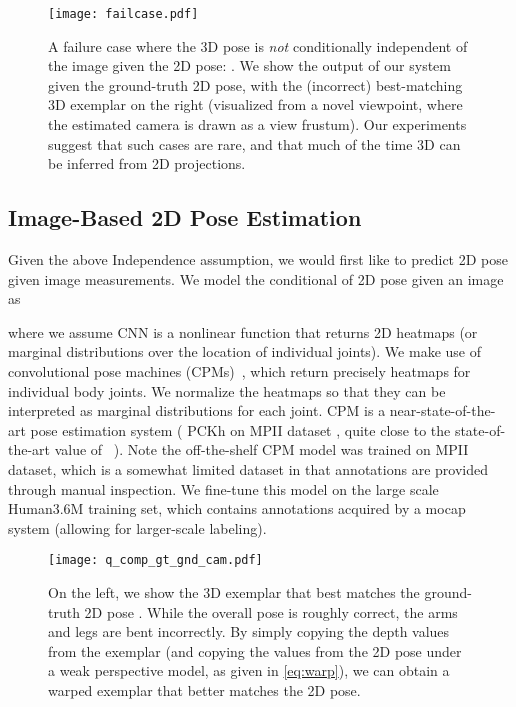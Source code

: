 \documentclass[10pt,twocolumn,letterpaper]{article}
\begin{document}
\begin{figure}[t!]
\centering
\texttt{[image: failcase.pdf]}
\caption{A failure case where the 3D pose is {\em not} conditionally independent of the image given the 2D pose: . We show the output of our system given the ground-truth 2D pose,  with the (incorrect) best-matching 3D exemplar on the right (visualized from a novel viewpoint, where the estimated camera is drawn as a view frustum). Our experiments suggest that such cases are rare, and that much of the time 3D can be inferred from 2D projections.}
\label{fig:failcase}
\end{figure}


\subsection{Image-Based 2D Pose Estimation}
Given the above Independence assumption, we would first like to predict 2D pose given image measurements. We model the conditional of 2D pose given an image as

\noindent where we assume CNN is a nonlinear function that returns  2D heatmaps (or marginal distributions over the location of individual joints).
We make use of convolutional pose machines (CPMs)~\cite{Wei_2016_CVPR}, which return precisely  heatmaps for individual body joints. We normalize the heatmaps so that they can be interpreted as marginal distributions for each joint. CPM is a near-state-of-the-art pose estimation system ( PCKh on MPII dataset \cite{andriluka14cvpr}, quite close to the state-of-the-art value of  ~\cite{newell2016stacked}). Note the off-the-shelf CPM model was trained on MPII dataset, which is a somewhat limited dataset in that annotations are provided through manual inspection. We fine-tune this model on the large scale Human3.6M \cite{h36m_pami} training set, which contains annotations acquired by a mocap system (allowing for larger-scale labeling).



\begin{figure}
\centering
\texttt{[image: q\_comp\_gt\_gnd\_cam.pdf]}
   \caption{On the left, we show the 3D exemplar  that best matches the ground-truth 2D pose . While the overall pose is roughly correct, the arms and legs are bent incorrectly. By simply copying the depth values from the exemplar (and copying the  values from the 2D pose under a weak perspective model, as given in \eqref{eq:warp}), we can obtain a warped exemplar  that better matches the 2D pose.}
\label{fig:warp}
\end{figure}
\end{document}
